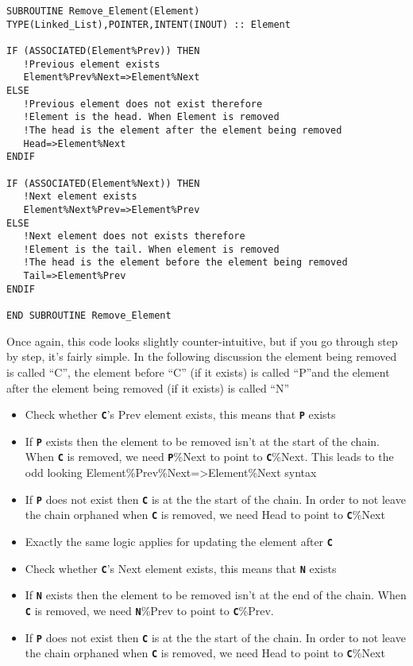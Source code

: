 \documentclass[12pt]{article}
\newcommand{\simpleboxverbatim}{\begin{Verbatim}[obeytabs=true,frame=single,
  framerule=0.5mm,rulecolor=\color{warwickmid}]}
\newcommand{\inlinecode}[1]{{\color{warwickred} \bf\texttt{#1}}}
\begin{document}
\simpleboxverbatim
SUBROUTINE Remove_Element(Element)
TYPE(Linked_List),POINTER,INTENT(INOUT) :: Element

IF (ASSOCIATED(Element%Prev)) THEN
   !Previous element exists
   Element%Prev%Next=>Element%Next
ELSE
   !Previous element does not exist therefore
   !Element is the head. When Element is removed
   !The head is the element after the element being removed
   Head=>Element%Next
ENDIF

IF (ASSOCIATED(Element%Next)) THEN
   !Next element exists
   Element%Next%Prev=>Element%Prev
ELSE
   !Next element does not exists therefore
   !Element is the tail. When element is removed
   !The head is the element before the element being removed
   Tail=>Element%Prev
ENDIF

END SUBROUTINE Remove_Element
\end{Verbatim}

Once again, this code looks slightly counter-intuitive, but if you go through
step by step, it's fairly simple. In the following discussion the element
being removed is called ``C'', the element before ``C'' (if it exists) is
called ``P''and the element after the element being removed (if it exists) is
called ``N''
\begin{itemize}
\item Check whether \inlinecode{C}'s Prev element exists, this means that
  \inlinecode{P} exists
\item If \inlinecode{P} exists then the element to be removed isn't at the
  start of the chain. When \inlinecode{C} is removed, we need
  \inlinecode{P}\%Next to point to \inlinecode{C}\%Next. This leads to the odd
  looking Element\%Prev\%Next=>Element\%Next syntax
\item If \inlinecode{P} does not exist then \inlinecode{C} is at the the start
  of the chain. In order to not leave the chain orphaned when \inlinecode{C}
  is removed, we need Head to point to \inlinecode{C}\%Next
\item Exactly the same logic applies for updating the element after
  \inlinecode{C}
\item Check whether \inlinecode{C}'s Next element exists, this means that
  \inlinecode{N} exists
\item If \inlinecode{N} exists then the element to be removed isn't at the end
  of the chain. When \inlinecode{C} is removed, we need \inlinecode{N}\%Prev
  to point to \inlinecode{C}\%Prev.
\item If \inlinecode{P} does not exist then \inlinecode{C} is at the the start
  of the chain. In order to not leave the chain orphaned when \inlinecode{C}
  is removed, we need Head to point to \inlinecode{C}\%Next
\end{itemize}
\end{document}

